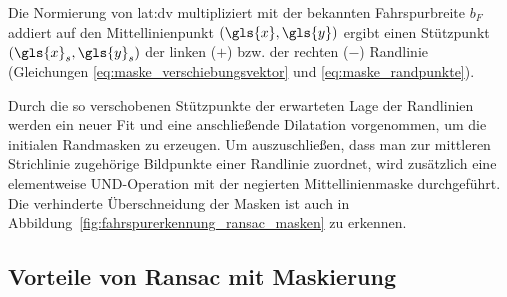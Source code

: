Die Normierung von \gls{lat:dv} multipliziert mit der bekannten Fahrspurbreite \( b_F \) addiert auf den Mittellinienpunkt \( (\gls{x},\gls{y}) \) ergibt einen Stützpunkt \( ({\gls{x}}_s,{\gls{y}}_s) \) der linken (\( + \)) bzw. der rechten (\( - \)) Randlinie (Gleichungen \eqref{eq:maske_verschiebungsvektor} und \eqref{eq:maske_randpunkte}).

Durch die so verschobenen Stützpunkte der erwarteten Lage der Randlinien werden ein neuer Fit und eine anschließende Dilatation vorgenommen, um die initialen Randmasken zu erzeugen. Um auszuschließen, dass man zur mittleren Strichlinie zugehörige Bildpunkte einer Randlinie zuordnet, wird zusätzlich eine elementweise UND-Operation mit der negierten Mittellinienmaske durchgeführt. Die verhinderte Überschneidung der Masken ist auch in Abbildung~\ref{fig:fahrspurerkennung_ransac_masken} zu erkennen.




\subsection{Vorteile von Ransac mit Maskierung}

